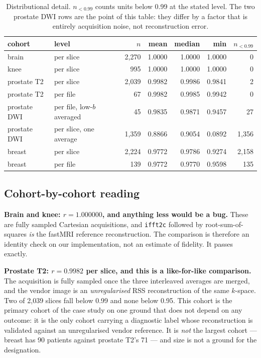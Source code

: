 \documentclass[11pt,a4paper]{article}
\begin{document}
\begin{table}[htbp]
\centering
\caption{Distributional detail. $n_{<0.99}$ counts units below 0.99 at the stated
level. The two prostate DWI rows are the point of this table: they differ by a factor
that is entirely acquisition noise, not reconstruction error.}
\label{tab:reconDetail}
\small
\begin{tabular}{@{}lL{3.4cm}rrrrr@{}}
\toprule
cohort & level & $n$ & mean & median & min & $n_{<0.99}$ \\
\midrule
brain        & per slice & 2{,}270 & 1.0000 & 1.0000 & 1.0000 & 0 \\
knee         & per slice &    995 & 1.0000 & 1.0000 & 1.0000 & 0 \\
prostate T2  & per slice & 2{,}039 & 0.9982 & 0.9986 & 0.9841 & 2 \\
prostate T2  & per file  &     67 & 0.9982 & 0.9985 & 0.9942 & 0 \\
prostate DWI & per file, low-$b$ averaged & 45 & 0.9835 & 0.9871 & 0.9457 & 27 \\
prostate DWI & per slice, one average & 1{,}359 & 0.8866 & 0.9054 & 0.0892 & 1{,}356 \\
breast       & per slice & 2{,}224 & 0.9772 & 0.9786 & 0.9274 & 2{,}158 \\
breast       & per file  &    139 & 0.9772 & 0.9770 & 0.9598 & 135 \\
\bottomrule
\end{tabular}
\end{table}

\subsection{Cohort-by-cohort reading}

\textbf{Brain and knee: $r = 1.000000$, and anything less would be a bug.} These are
fully sampled Cartesian acquisitions, and \texttt{ifft2c} followed by root-sum-of-
squares \emph{is} the fastMRI reference reconstruction. The comparison is therefore an
identity check on our implementation, not an estimate of fidelity. It passes exactly.

\textbf{Prostate T2: $r = 0.9982$ per slice, and this is a like-for-like comparison.}
The acquisition is fully sampled once the three interleaved averages are merged, and
the vendor image is an \emph{unregularised} RSS reconstruction of the same $k$-space.
Two of 2{,}039 slices fall below 0.99 and none below 0.95. This cohort is the primary
cohort of the case study on one ground that does not depend on any outcome: it is the
only cohort carrying a diagnostic label whose reconstruction is validated against an
unregularised vendor reference. It is \emph{not} the largest cohort --- breast has 90
patients against prostate T2's 71 --- and size is not a ground for the designation.
\end{document}
